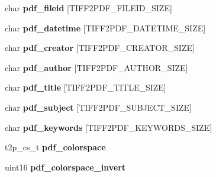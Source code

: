 \begin{DoxyCompactItemize}
\item 
\hypertarget{struct_t2_p_a28c176544810d74852b81bcbbd76a4f7}{}char {\bfseries pdf\+\_\+fileid} \mbox{[}T\+I\+F\+F2\+P\+D\+F\+\_\+\+F\+I\+L\+E\+I\+D\+\_\+\+S\+I\+Z\+E\mbox{]}\label{struct_t2_p_a28c176544810d74852b81bcbbd76a4f7}

\item 
\hypertarget{struct_t2_p_a5d72981506daf19e67a3d08aa079b568}{}char {\bfseries pdf\+\_\+datetime} \mbox{[}T\+I\+F\+F2\+P\+D\+F\+\_\+\+D\+A\+T\+E\+T\+I\+M\+E\+\_\+\+S\+I\+Z\+E\mbox{]}\label{struct_t2_p_a5d72981506daf19e67a3d08aa079b568}

\item 
\hypertarget{struct_t2_p_af1673cdd7529f58e0d29934d8a919a3e}{}char {\bfseries pdf\+\_\+creator} \mbox{[}T\+I\+F\+F2\+P\+D\+F\+\_\+\+C\+R\+E\+A\+T\+O\+R\+\_\+\+S\+I\+Z\+E\mbox{]}\label{struct_t2_p_af1673cdd7529f58e0d29934d8a919a3e}

\item 
\hypertarget{struct_t2_p_a8a903d20a10cc11ca410622e1c14166f}{}char {\bfseries pdf\+\_\+author} \mbox{[}T\+I\+F\+F2\+P\+D\+F\+\_\+\+A\+U\+T\+H\+O\+R\+\_\+\+S\+I\+Z\+E\mbox{]}\label{struct_t2_p_a8a903d20a10cc11ca410622e1c14166f}

\item 
\hypertarget{struct_t2_p_ab2b8e13899c1effe4ed723598d651962}{}char {\bfseries pdf\+\_\+title} \mbox{[}T\+I\+F\+F2\+P\+D\+F\+\_\+\+T\+I\+T\+L\+E\+\_\+\+S\+I\+Z\+E\mbox{]}\label{struct_t2_p_ab2b8e13899c1effe4ed723598d651962}

\item 
\hypertarget{struct_t2_p_a365ce5386ea498eae116f6e7441900b1}{}char {\bfseries pdf\+\_\+subject} \mbox{[}T\+I\+F\+F2\+P\+D\+F\+\_\+\+S\+U\+B\+J\+E\+C\+T\+\_\+\+S\+I\+Z\+E\mbox{]}\label{struct_t2_p_a365ce5386ea498eae116f6e7441900b1}

\item 
\hypertarget{struct_t2_p_adc8136d7a5e02569e8fbea6c1e15ad2c}{}char {\bfseries pdf\+\_\+keywords} \mbox{[}T\+I\+F\+F2\+P\+D\+F\+\_\+\+K\+E\+Y\+W\+O\+R\+D\+S\+\_\+\+S\+I\+Z\+E\mbox{]}\label{struct_t2_p_adc8136d7a5e02569e8fbea6c1e15ad2c}

\item 
\hypertarget{struct_t2_p_a6472a215fe3a5ebcacae53e4151664d9}{}t2p\+\_\+cs\+\_\+t {\bfseries pdf\+\_\+colorspace}\label{struct_t2_p_a6472a215fe3a5ebcacae53e4151664d9}

\item 
\hypertarget{struct_t2_p_aaa9f1707d382e63db1b19c08c2b75a1e}{}uint16 {\bfseries pdf\+\_\+colorspace\+\_\+invert}\label{struct_t2_p_aaa9f1707d382e63db1b19c08c2b75a1e}


\end{DoxyCompactItemize}
